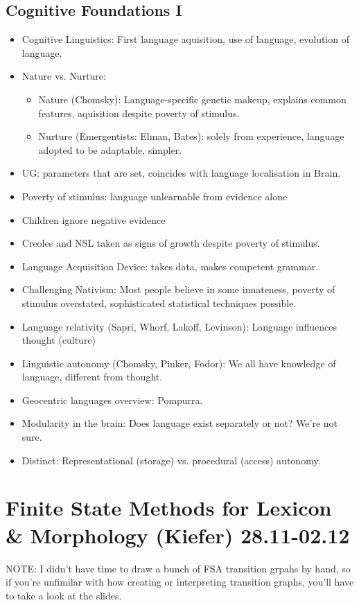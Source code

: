 \documentclass[11pt]{article}
\newenvironment{itemise}{
\begin{itemize}
  \setlength{\itemsep}{1pt}
  \setlength{\parskip}{0pt}
  \setlength{\parsep}{0pt}
}{\end{itemize}}
\begin{document}
\subsection{Cognitive Foundations I}
\begin{itemise}
 \item Cognitive Linguistics: First language aquisition, use of language, evolution of language.
 \item Nature vs. Nurture:
 \begin{itemise}
	\item Nature (Chomsky): Language-specific genetic makeup, explains common features, aquisition despite poverty of stimulus.
	\item Nurture (Emergentists: Elman, Bates): solely from experience, language adopted to be adaptable, simpler.
 \end{itemise}
 \item UG: parameters that are set, coincides with language localisation in Brain.
 \item Poverty of stimulus: language unlearnable from evidence alone
 \item Children ignore negative evidence
 \item Creoles and NSL taken as signs of growth despite poverty of stimulus.
 \item Language Acquisition Device: takes data, makes competent grammar.
 \item Challenging Nativism: Most people believe in some innateness, poverty of stimulus overstated, sophisticated statistical techniques possible.
 \item Language relativity (Sapri, Whorf, Lakoff, Levinson): Language influences thought (culture)
 \item Linguistic autonomy (Chomsky, Pinker, Fodor): We all have knowledge of language, different from thought.
 \item Geocentric languages overview: Pompurra.
 \item Modularity in the brain: Does language exist separately or not? We're not sure.
 \item Distinct: Representational (storage) vs. procedural (access)  autonomy. 
\end{itemise}


%
\section{Finite State Methods for Lexicon \& Morphology (Kiefer) 28.11-02.12}
NOTE: I didn't have time to draw a bunch of FSA transition grpahs by hand, so if you're unfimilar with how creating or interpreting transition graphs, you'll have to take a look at the slides.
\end{document}
